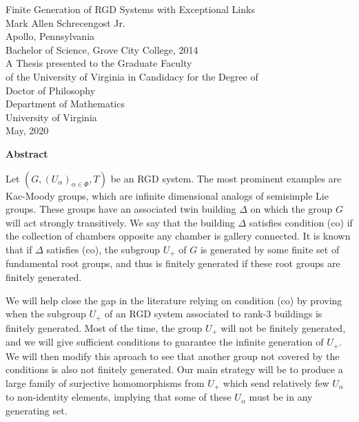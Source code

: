 \documentclass[12 pt,oneside]{book}
\begin{document}
\frontmatter
\begin{center}
	\thispagestyle{empty}
	\vspace*{1 in}
	Finite Generation of RGD Systems with Exceptional Links\\[1 in]
	Mark Allen Schrecengost Jr.\\
	Apollo, Pennsylvania\\[0.5 in]
	Bachelor of Science, Grove City College, 2014\\[1.5 in]
	A Thesis presented to the Graduate Faculty\\
	of the University of Virginia in Candidacy for the Degree of\\
	Doctor of Philosophy\\[0.5 in]
	Department of Mathematics\\[0.5 in]
	University of Virginia\\
	May, 2020
\end{center}
\vfill
\hfill{}
\clearpage
\thispagestyle{empty}
\begin{center}
	\textbf{Abstract}
\end{center}
Let $(G,(U_\alpha)_{\alpha\in \Phi},T)$ be an RGD system. The most prominent examples are Kac-Moody groups, which are infinite dimensional analogs of semisimple Lie groups. These groups have an associated twin building $\Delta$ on which the group $G$ will act strongly transitively. We say that the building $\Delta$ satisfies condition (co) if the collection of chambers opposite any chamber is gallery connected. It is known that if $\Delta$ satisfies (co), the subgroup $U_+$ of $G$ is generated by some finite set of fundamental root groups, and thus is finitely generated if these root groups are finitely generated.

We will help close the gap in the literature relying on condition (co) by proving when the subgroup $U_+$ of an RGD system associated to rank-3 buildings is finitely generated. Most of the time, the group $U_+$ will not be finitely generated, and we will give sufficient conditions to guarantee the infinite generation of $U_+.$ We will then modify this aproach to see that another group not covered by the conditions is also not finitely generated. Our main strategy will be to produce a large family of surjective homomorphisms from $U_+$ which send relatively few $U_\alpha$ to non-identity elements, implying that some of these $U_\alpha$ must be in any generating set.
\end{document}
